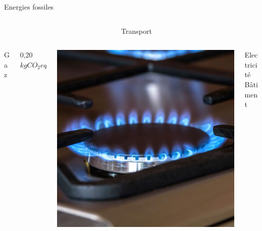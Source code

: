 \documentclass{beamer}
\begin{document}
\begin{frame}{Energies fossiles}
\begin{columns}
\begin{column}{0.25\textwidth}
\end{column}
\begin{column}{0.15\textwidth}
Transport
\end{column}
\end{columns}
\vspace{0.3cm}
\begin{columns}
  \begin{column}{0.15\textwidth}
Gaz
\end{column}
\begin{column}{0.3\textwidth}
0,20 $kgCO_2 eq/kWh$
\end{column}
\begin{column}{0.25\textwidth}
  \includegraphics[scale=0.088]{images/gaz.jpeg}
\end{column}
\begin{column}{0.15\textwidth}
Electricité\\ Bâtiment
\end{column}
\end{columns}
\end{frame}
\end{document}
